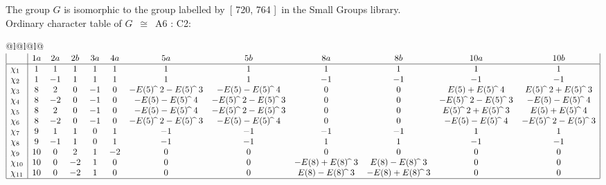 \documentclass[varwidth=\maxdimen,border=10]{standalone}
\begin{document}
The group $G$ is isomorphic to the group labelled by\ [ 720, 764 ]\ in the Small Groups library.\\
Ordinary character table of $G$\ $\cong$\ A6 : C2:\\
\begin{center}
\begin{tabular}{@{}l@{}l@{}l@{}}
\hline
\(\begin{array}{|l|ccccccccccc|}
  & 1a & 2a & 2b & 3a & 4a & 5a & 5b & 8a & 8b & 10a & 10b\\ \hline
\chi_{1} & 1 & 1 & 1 & 1 & 1 & 1 & 1 & 1 & 1 & 1 & 1\\
\chi_{2} & 1 & -1 & 1 & 1 & 1 & 1 & 1 & -1 & -1 & -1 & -1\\
\chi_{3} & 8 & 2 & 0 & -1 & 0 & -E(5) \widehat{\ }\ {2}-E(5) \widehat{\ }\ {3} & -E(5)-E(5) \widehat{\ }\ {4} & 0 & 0 & E(5)+E(5) \widehat{\ }\ {4} & E(5) \widehat{\ }\ {2}+E(5) \widehat{\ }\ {3}\\
\chi_{4} & 8 & -2 & 0 & -1 & 0 & -E(5)-E(5) \widehat{\ }\ {4} & -E(5) \widehat{\ }\ {2}-E(5) \widehat{\ }\ {3} & 0 & 0 & -E(5) \widehat{\ }\ {2}-E(5) \widehat{\ }\ {3} & -E(5)-E(5) \widehat{\ }\ {4}\\
\chi_{5} & 8 & 2 & 0 & -1 & 0 & -E(5)-E(5) \widehat{\ }\ {4} & -E(5) \widehat{\ }\ {2}-E(5) \widehat{\ }\ {3} & 0 & 0 & E(5) \widehat{\ }\ {2}+E(5) \widehat{\ }\ {3} & E(5)+E(5) \widehat{\ }\ {4}\\
\chi_{6} & 8 & -2 & 0 & -1 & 0 & -E(5) \widehat{\ }\ {2}-E(5) \widehat{\ }\ {3} & -E(5)-E(5) \widehat{\ }\ {4} & 0 & 0 & -E(5)-E(5) \widehat{\ }\ {4} & -E(5) \widehat{\ }\ {2}-E(5) \widehat{\ }\ {3}\\
\chi_{7} & 9 & 1 & 1 & 0 & 1 & -1 & -1 & -1 & -1 & 1 & 1\\
\chi_{8} & 9 & -1 & 1 & 0 & 1 & -1 & -1 & 1 & 1 & -1 & -1\\
\chi_{9} & 10 & 0 & 2 & 1 & -2 & 0 & 0 & 0 & 0 & 0 & 0\\
\chi_{10} & 10 & 0 & -2 & 1 & 0 & 0 & 0 & -E(8)+E(8) \widehat{\ }\ {3} & E(8)-E(8) \widehat{\ }\ {3} & 0 & 0\\
\chi_{11} & 10 & 0 & -2 & 1 & 0 & 0 & 0 & E(8)-E(8) \widehat{\ }\ {3} & -E(8)+E(8) \widehat{\ }\ {3} & 0 & 0\\
\hline
\end{array}\)\\
\end{tabular}
\end{center}
\end{document}
